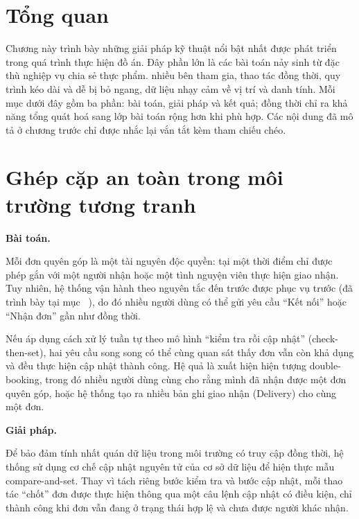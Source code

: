 \documentclass[../main.tex]{subfiles}%
\begin{document}
\setcounter{chapter}{5}
\makeatletter
\newcommand{\chapterFiveRef}[2]{%
  \@ifundefined{r@#1}{#2}{\ref{#1}}%
}
\makeatother

\section{Tổng quan}

Chương này trình bày những giải pháp kỹ thuật nổi bật nhất được phát triển trong quá trình thực hiện đồ án. Đây phần lớn là các bài toán nảy sinh từ đặc thù nghiệp vụ chia sẻ thực phẩm. nhiều bên tham gia, thao tác đồng thời, quy trình kéo dài và dễ bị bỏ ngang, dữ liệu nhạy cảm về vị trí và danh tính. Mỗi mục dưới đây gồm ba phần: bài toán, giải pháp và kết quả; đồng thời chỉ ra khả năng tổng quát hoá sang lớp bài toán rộng hơn khi phù hợp. Các nội dung đã mô tả ở chương trước chỉ được nhắc lại vắn tắt kèm tham chiếu chéo.

\section{Ghép cặp an toàn trong môi trường tương tranh}
\label{section:5.1}

\textbf{Bài toán.}

Mỗi đơn quyên góp là một tài nguyên độc quyền: tại một thời điểm chỉ được phép gắn với một người nhận hoặc một tình nguyện viên thực hiện giao nhận. Tuy nhiên, hệ thống vận hành theo nguyên tắc đến trước được phục vụ trước (đã trình bày tại mục~\chapterFiveRef{subsection:2.3.6}{2.3.6}), do đó nhiều người dùng có thể gửi yêu cầu ``Kết nối'' hoặc ``Nhận đơn'' gần như đồng thời.

Nếu áp dụng cách xử lý tuần tự theo mô hình ``kiểm tra rồi cập nhật'' (check-then-set), hai yêu cầu song song có thể cùng quan sát thấy đơn vẫn còn khả dụng và đều thực hiện cập nhật thành công. Hệ quả là xuất hiện hiện tượng double-booking, trong đó nhiều người dùng cùng cho rằng mình đã nhận được một đơn quyên góp, hoặc hệ thống tạo ra nhiều bản ghi giao nhận (Delivery) cho cùng một đơn.

\textbf{Giải pháp.}

Để bảo đảm tính nhất quán dữ liệu trong môi trường có truy cập đồng thời, hệ thống sử dụng cơ chế cập nhật nguyên tử của cơ sở dữ liệu để hiện thực mẫu compare-and-set. Thay vì tách riêng bước kiểm tra và bước cập nhật, mỗi thao tác ``chốt'' đơn được thực hiện thông qua một câu lệnh cập nhật có điều kiện, chỉ thành công khi đơn vẫn đang ở trạng thái hợp lệ và chưa được người khác nhận.
\end{document}
